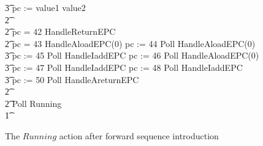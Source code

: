 \begin{figure}[t!]
\begin{circus}
    \t3 pc := \IF value1 \leq value2   \\
    \t2 {} \cdots {} \\
    \t2 {} \circelse pc = 42 \circthen HandleReturnEPC \\
    \t2 {} \circelse pc = 43 \circthen HandleAloadEPC(0) \circseq pc := 44 \circseq Poll \circseq HandleAloadEPC(0) \circseq \\
    \t3 pc := 45 \circseq Poll \circseq HandleIaddEPC \circseq pc := 46 \circseq Poll \circseq HandleAloadEPC(0) \circseq \\
    \t3 pc := 47 \circseq Poll \circseq HandleIaddEPC \circseq pc := 48 \circseq Poll \circseq HandleIaddEPC \circseq \\
    \t3 pc := 50 \circseq Poll \circseq HandleAreturnEPC \\
    \t2 {} \cdots {} \\
    \t2 \circfi \circseq Poll \circseq Running \\
    \t1 \circfi
  \end{circus}
  \caption{The $Running$ action after forward sequence introduction}
  \label{forward-sequence-introduction-example-figure}
\end{figure}


